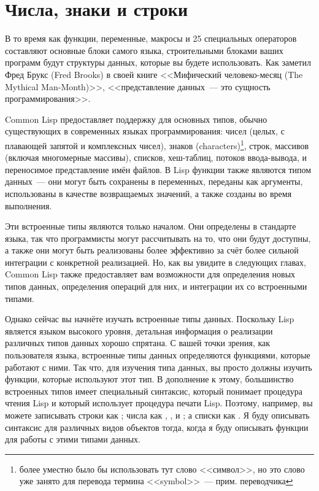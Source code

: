 \chapter{Числа, знаки и строки}
\label{ch:10}

В то время как функции, переменные, макросы и 25 специальных операторов составляют
основные блоки самого языка, строительными блоками ваших программ будут структуры данных,
которые вы будете использовать.  Как заметил Фред Брукс (Fred Brooks) в своей книге
<<Мифический человеко-месяц (The Mythical Man-Month)>>, <<представление данных~--- это
сущность программирования>>.

Common Lisp предоставляет поддержку для основных типов, обычно существующих в современных
языках программирования: чисел (целых, с плавающей запятой и комплексных чисел), знаков
(characters)\footnote{более уместно было бы использовать тут слово <<символ>>, но это слово
  уже занято для перевода термина <<symbol>>~--- прим. переводчика }, строк, массивов
(включая многомерные массивы), списков, хеш-таблиц, потоков ввода-вывода, и переносимое
представление имён файлов.  В Lisp функции также являются типом данных~--- они могут быть
сохранены в переменных, переданы как аргументы, использованы в качестве возвращаемых
значений, а также созданы во время выполнения.

Эти встроенные типы являются только началом.  Они определены в стандарте языка, так что
программисты могут рассчитывать на то, что они будут доступны, а также они могут быть
реализованы более эффективно за счёт более сильной интеграции с конкретной реализацией.
Но, как вы увидите в следующих главах, Common Lisp также предоставляет вам возможности для
определения новых типов данных, определения операций для них, и интеграции их со
встроенными типами.

Однако сейчас вы начнёте изучать встроенные типы данных.  Поскольку Lisp является языком
высокого уровня, детальная информация о реализации различных типов данных хорошо спрятана.
С вашей точки зрения, как пользователя языка, встроенные типы данных определяются
функциями, которые работают с ними.  Так что, для изучения типа данных, вы просто должны
изучить функции, которые используют этот тип.  В дополнение к этому, большинство
встроенных типов имеет специальный синтаксис, который понимает процедура чтения Lisp и
который использует процедура печати Lisp.  Поэтому, например, вы можете записывать строки
как ; числа как , , и ; а списки как .  Я буду описывать синтаксис для различных видов объектов тогда, когда я буду
описывать функции для работы с этими типами данных.

